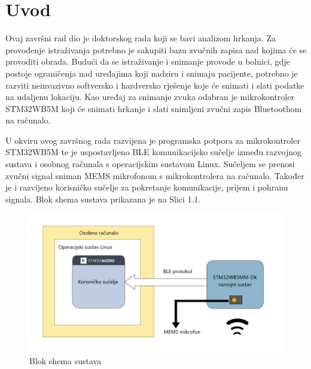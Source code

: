 \chapter{Uvod}


Ovaj završni rad dio je doktorskog rada koji se bavi analizom hrkanja. Za provođenje istraživanja potrebno je sakupiti bazu zvučnih zapisa nad kojima će se provoditi obrada. Budući da se istraživanje i snimanje provode u bolnici, gdje postoje ograničenja nad uređajima koji nadziru i snimaju pacijente, potrebno je razviti neinvazivno softversko i hardversko rješenje koje će snimati i slati podatke na udaljenu lokaciju. Kao uređaj za snimanje zvuka odabran je mikrokontroler STM32WB5M koji će snimati hrkanje i slati snimljeni zvučni zapis Bluetoothom na računalo.  

U okviru ovog završnog rada razvijena je programska potpora za mikrokontroler STM32WB5M te je uspostavljeno BLE komunikacijsko sučelje između razvojnog sustava i osobnog računala s operacijskim sustavom Linux. Sučeljem se prenosi zvučni signal sniman MEMS mikrofonom s mikrokontrolera na računalo. Također je i razvijeno korisničko sučelje za pokretanje komunikacije, prijem i pohranu signala. Blok shema sustava prikazana je na Slici 1.1. 

\begin{figure}[ht]
	\includegraphics[width=\linewidth]{imgs/shema}
	\caption{Blok shema sustava}
	 \label{fig:shema}
\end{figure}

\eject